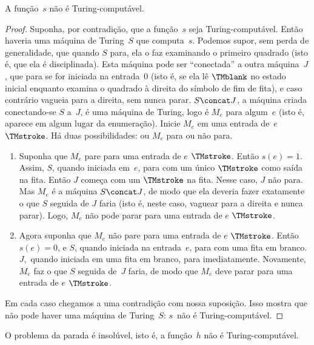 \documentclass[../../../include/open-logic-section]{subfiles}
\begin{document}
\begin{lem}
A função~$s$ não é Turing-computável.
\end{lem}

\begin{proof}
Suponha, por contradição, que a função~$s$ seja Turing-computável.
Então haveria uma máquina de Turing~$S$ que computa~$s$. Podemos supor,
sem perda de generalidade, que quando $S$ para, ela o faz examinando o
primeiro quadrado (isto é, que ela é disciplinada). Esta máquina pode
ser ``conectada'' a outra máquina~$J$, que para se for iniciada na
entrada~$0$ (isto é, se ela lê $\TMblank$ no estado inicial enquanto
examina o quadrado à direita do símbolo de fim de fita), e caso
contrário vagueia para a direita, sem nunca parar. $S \concat J$, a
máquina criada conectando-se $S$ a~$J$, é uma máquina de Turing, logo é
$M_e$ para algum~$e$ (isto é, aparece em algum lugar da enumeração).
Inicie $M_e$ em uma entrada de~$e$ $\TMstroke$. Há duas
possibilidades: ou $M_e$ para ou não para.
\begin{enumerate}
\item Suponha que $M_e$ pare para uma entrada de $e$ $\TMstroke$. Então
  $s(e) = 1$. Assim, $S$, quando iniciada em~$e$, para com um único
  $\TMstroke$ como saída na fita. Então $J$ começa com um $\TMstroke$
  na fita. Nesse caso, $J$ não para. Mas $M_e$ é a máquina $S \concat
  J$, de modo que ela deveria fazer exatamente o que $S$ seguida de
  $J$ faria (isto é, neste caso, vaguear para a direita e nunca
  parar). Logo, $M_e$ não pode parar para uma entrada de $e$
  $\TMstroke$.

\item Agora suponha que $M_e$ não pare para uma entrada de $e$
  $\TMstroke$. Então $s(e) = 0$, e $S$, quando iniciada na entrada~$e$,
  para com uma fita em branco. $J$,~quando iniciada em uma fita em
  branco, para imediatamente. Novamente, $M_e$ faz o que $S$ seguida
  de~$J$ faria, de modo que $M_e$ deve parar para uma entrada de $e$
  $\TMstroke$.
\end{enumerate}
Em cada caso chegamos a uma contradição com nossa suposição. Isso
mostra que não pode haver uma máquina de Turing~$S$: $s$~não é
Turing-computável.
\end{proof}

\begin{thm}
 O problema da parada é insolúvel, isto
é, a função~$h$ não é Turing-computável.
\end{thm}
\end{document}
